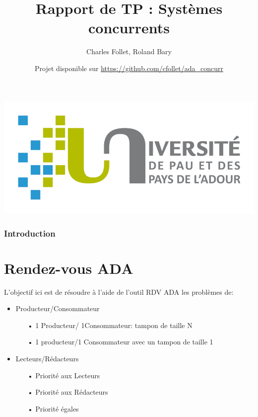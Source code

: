 \documentclass[11pt,a4paper]{article}
\title{\textbf{Rapport de TP : Systèmes concurrents}}
\author{Charles Follet, Roland Bary}
\date{Projet disponible sur  \url{https://github.com/cfollet/ada_concurr}}
\begin{document}
\maketitle
\begin{center}
    \begin{center}
        \includegraphics[scale=0.3]{logoUppa.png}
    \end{center}
\end{center}
\thispagestyle{empty}
\newpage
\pagestyle{fancy}
\renewcommand{\contentsname}{Sommaire}
\tableofcontents
\newpage
\section*{Introduction}
\part{Rendez-vous ADA}
L'objectif ici est de résoudre à l'aide de l'outil RDV ADA les problèmes de:
\begin{itemize}
    \item Producteur/Consommateur
          \begin{itemize}
            \item[•]1 Producteur/ 1Consommateur: tampon de taille N
            \item[•]1 producteur/1 Consommateur avec un tampon de taille 1
          \end{itemize}
    \item Lecteurs/Rédacteurs
          \begin{itemize}
            \item[•] Priorité aux Lecteurs
            \item[•] Priorité aux Rédacteurs
            \item[•] Priorité égales
          \end{itemize}
\end{itemize}
\end{document}
